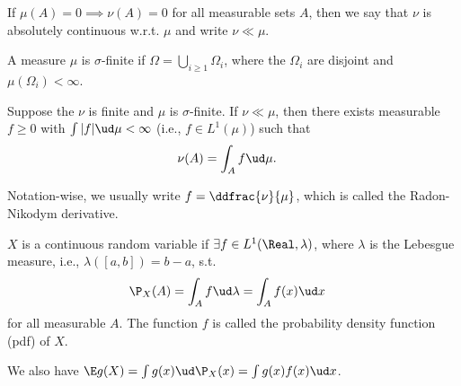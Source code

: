 \documentclass[../aipt.tex]{subfiles}
\begin{document}
\begin{Definition}\label{wk4:def:expectation continuous}
If $\mu (A) =0 \implies \nu(A)=0$ for all measurable sets $A$, then we say that $\nu$ is absolutely continuous w.r.t. $\mu$ and write $\nu \ll \mu$.
\end{Definition}

A measure $\mu$ is $\sigma$-finite if $\Omega= \bigcup_{i\geq 1}{\Omega_i}$, where the $\Omega_i$ are disjoint and $\mu(\Omega_i)<\infty$.

\begin{Theorem}\label{wk4:Radon-Nikodym Theorem}
Suppose the $\nu$ is finite and $\mu$ is $\sigma$-finite. If $\nu \ll \mu$, then there exists measurable $f \geq 0$ with $ \int {|f|} \ud \mu <\infty$ (i.e., $f\in L^1(\mu)$) such that
\begin{align*}
\nu(A) & = \int_{A} f \ud\mu.
\end{align*}
\end{Theorem}
Notation-wise, we usually write $f = \ddfrac{\nu}{\mu}$, which is called the Radon-Nikodym derivative. 

\begin{Definition}
$X$ is a continuous random variable if $\exists f \in L^1(\Real,\lambda)$, where $\lambda$ is the Lebesgue measure, i.e., $\lambda([a,b])=b-a$, s.t.\
\begin{align*}
\P_X(A)& =\int_{A} f \ud\lambda =\int_{A} f(x) \ud x
\end{align*}
for all measurable $A$. The function $f$ is called the probability density function (pdf) of $X$. 
\end{Definition}
We also have $ \E g(X) = \int g(x) \ud \P_X(x) = \int g(x) f(x) \ud x$.



%

\end{document}
